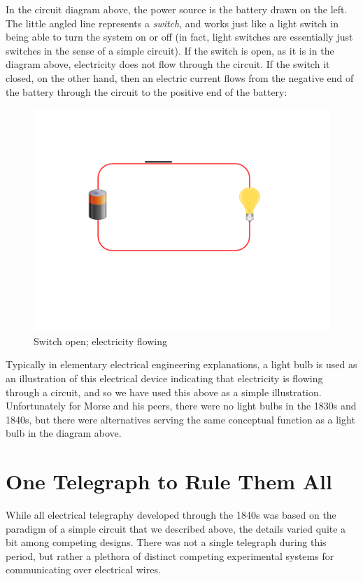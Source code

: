 \documentclass[UTF8]{book}
\begin{document}
\begin{CJK}{UTF8}{gbsn}
In the circuit diagram above, the power source is the battery drawn on the left. The little angled line represents a \emph{switch}, and works just like a light switch in being able to turn the system on or off (in fact, light switches are essentially just switches in the sense of a simple circuit). If the switch is open, as it is in the diagram above, electricity does not flow through the circuit. If the switch it closed, on the other hand, then an electric current flows from the negative end of the battery through the circuit to the positive end of the battery:

\begin{figure}[H]
\centering
\includegraphics[width=0.8\linewidth]{circuit2}
\caption{Switch open; electricity flowing}
\end{figure}

Typically in elementary electrical engineering explanations, a light bulb is used as an illustration of this electrical device indicating that electricity is flowing through a circuit, and so we have used this above as a simple illustration. Unfortunately for Morse and his peers, there were no light bulbs in the 1830s and 1840s, but there were alternatives serving the same conceptual function as a light bulb in the diagram above.

\section{One Telegraph to Rule Them All}

While all electrical telegraphy developed through the 1840s was based on the paradigm of a simple circuit that we described above, the details varied quite a bit among competing designs. There was not a single telegraph during this period, but rather a plethora of distinct competing experimental systems for communicating over electrical wires.


\end{CJK}
\end{document}
